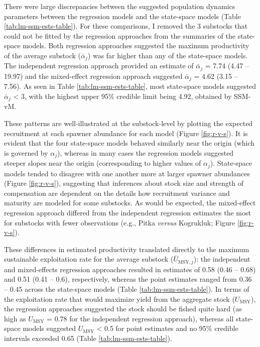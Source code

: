 \documentclass[12pt,]{book}
\theoremstyle{definition}
\theoremstyle{definition}
\theoremstyle{definition}
\theoremstyle{remark}
\begin{document}
\noindent
There were large discrepancies between the suggested population dynamics
parameters between the regression models and the state-space models
(Table \ref{tab:lm-ssm-ests-table}). For these comparisons, I removed
the 3 substocks that could not be fitted by the regression approaches
from the summaries of the state-space models. Both regression approaches
suggested the maximum productivity of the average substock
(\(\bar{\alpha}_j\)) was far higher than any of the state-space models.
The independent regression approach provided an estimate of
\(\bar{\alpha}_j\) = 7.74 (4.47 -- 19.97) and the mixed-effect
regression approach suggested \(\bar{\alpha}_j\) = 4.62 (3.15 -- 7.56).
As seen in Table \ref{tab:lm-ssm-ests-table}, most state-space models
suggested \(\bar{\alpha}_j\) \textless{} 3, with the highest upper 95\%
credible limit being 4.92, obtained by SSM-vM.

These patterns are well-illustrated at the substock-level by plotting
the expected recruitment at each spawner abundance for each model
(Figure \ref{fig:r-v-s}). It is evident that the four state-space models
behaved similarly near the origin (which is governed by \(\alpha_j\)),
whereas in many cases the regression models suggested steeper slopes
near the origin (corresponding to higher values of \(\alpha_j\)).
State-space models tended to disagree with one another more at larger
spawner abundances (Figure \ref{fig:r-v-s}), suggesting that inferences
about stock size and strength of compensation are dependent on the
details how recruitment variance and maturity are modeled for some
substocks. As would be expected, the mixed-effect regression approach
differed from the independent regression estimates the most for
substocks with fewer observations (e.g., Pitka \emph{versus} Kogrukluk;
Figure \ref{fig:r-v-s}).

These differences in estimated productivity translated directly to the
maximum sustainable exploitation rate for the average substock
(\(\bar{U}_{\text{MSY},j}\)): the independent and mixed-effects
regression approaches resulted in estimates of 0.58 (0.46 -- 0.68) and
0.51 (0.41 -- 0.6), respectively, whereas the point estimates ranged
from 0.36 -- 0.45 across the state-space models (Table
\ref{tab:lm-ssm-ests-table}). In terms of the exploitation rate that
would maximize yield from the aggregate stock (\(U_{\text{MSY}}\)), the
regression approaches suggested the stock should be fished quite hard
(as high as \(U_{\text{MSY}}\) = 0.78 for the independent regression
approach), whereas all state-space models suggested \(U_{\text{MSY}}\)
\textless{} 0.5 for point estimates and no 95\% credible intervals
exceeded 0.65 (Table \ref{tab:lm-ssm-ests-table}).
\end{document}
